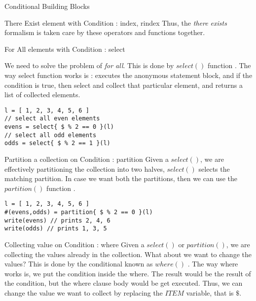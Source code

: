 \begin{section}{Conditional Building Blocks}
\begin{subsection}{There Exist element with Condition : index, rindex }
Thus, the \emph{there exists} formalism is taken care by these operators and functions together.

\end{subsection}


\begin{subsection}{For All elements with Condition : select }

We need to solve the problem of \emph{for all}. This is done by $select()$ function .
The way select function works is : executes the anonymous statement block, and if the condition is true, 
then select and collect that particular element, and returns a list of collected elements.

\begin{lstlisting}[style=JexlStyle]
l = [ 1, 2, 3, 4, 5, 6 ]
// select all even elements 
evens = select{ $ % 2 == 0 }(l)
// select all odd elements 
odds = select{ $ % 2 == 1 }(l) 
\end{lstlisting}

\end{subsection}

\begin{subsection}{Partition a collection on Condition : partition }
Given a $select()$, we are effectively partitioning the collection into two halves,
$select()$ selects the matching partition. In case we want both the partitions, then 
we can use the $partition()$ function .

\begin{center}\begin{minipage}{\linewidth}
\begin{lstlisting}[style=JexlStyle]
l = [ 1, 2, 3, 4, 5, 6 ]
#(evens,odds) = partition{ $ % 2 == 0 }(l)
write(evens) // prints 2, 4, 6 
write(odds) // prints 1, 3, 5
\end{lstlisting}\end{minipage}
\end{center}

\end{subsection}

\begin{subsection}{Collecting value on Condition : where }
Given a $select()$ or $partition()$, we are collecting the values already 
in the collection. What about we want to change the values? 
This is done by the conditional known as $where()$ .
The way where works is, we put the condition inside the where.
The result would be the result of the condition, but the where clause body 
would be get executed. Thus, we can change the value we want to collect
by replacing the $ITEM$ variable, that is $\$$.


\end{subsection}
\end{section}
